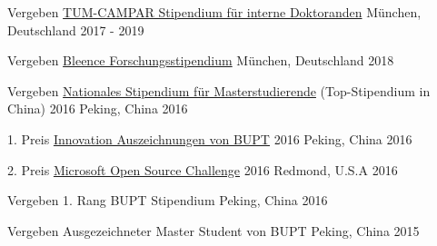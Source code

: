 




\begin{cvhonors}

\cvhonor
{Vergeben} %
{\href{}{TUM-CAMPAR Stipendium für interne Doktoranden} } %
{München, Deutschland} %
{2017 - 2019} %

\cvhonor
{Vergeben} %
{\href{https://bleenco.com/}{Bleence Forschungsstipendium} } %
{München, Deutschland} %
{2018} %

\cvhonor
{Vergeben} %
{\href{http://sice.bupt.edu.cn/info/1008/1546.htm}{Nationales Stipendium für Masterstudierende} (Top-Stipendium in China) 2016} %
{Peking, China} %
{2016} %

\cvhonor
{1. Preis} %
{\href{http://my.bupt.edu.cn/detach.portal?.pmn=view&action=browser&.ia=false&.pen=pe1144&bulletinId=fc089be9-6d81-11e6-ae27-4f4915a784ea}{Innovation Auszeichnungen von BUPT} 2016} %
{Peking, China} %
{2016} %


\cvhonor
{2. Preis} %
{\href{https://www.microsoft.com/en-us/research/academic-program/microsoft-open-source-challenge/}{Microsoft Open Source Challenge} 2016} %
{Redmond, U.S.A} %
{2016} %


\cvhonor
{Vergeben} %
{1. Rang BUPT Stipendium} %
{Peking, China} %
{2016} %

\cvhonor
{Vergeben} %
{Ausgezeichneter Master Student von BUPT} %
{Peking, China} %
{2015} %


\end{cvhonors}
